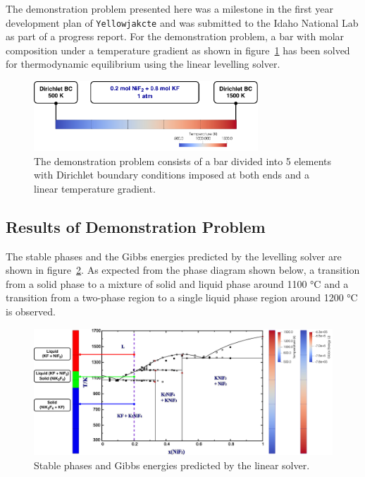  	The demonstration problem presented here was a milestone in the first year development plan of \texttt{Yellowjakcte} and was submitted to the Idaho National Lab as part of a progress report. For the demonstration problem, a bar with molar composition  under a temperature gradient as shown in figure~\ref{fig:demo_problem} has been solved for thermodynamic equilibrium using the linear levelling solver.
    
    	\begin{figure}[h]
        		\centering
        		\includegraphics[width=0.75\textwidth]{figures/Demo_prob.pdf}
        		\caption{The demonstration problem consists of a bar divided into 5 elements with Dirichlet boundary conditions imposed at both ends and a linear temperature gradient.}
        		\label{fig:demo_problem}
    	\end{figure}

	\subsection{Results of Demonstration Problem}
	The stable phases and the Gibbs energies predicted by the levelling solver are shown in figure~\ref{fig:results}. As expected from the phase diagram shown below, a transition from a solid phase to a mixture of solid and liquid phase around 1100 \si{\celsius} and a transition from a two-phase region to a single  liquid phase region around 1200 \si{\celsius} is observed.
    
    	\begin{figure}[h]
        		\centering
        		\includegraphics[width=\textwidth]{figures/Results.pdf}
        		\caption{Stable phases and Gibbs energies predicted by the linear solver.}
        		\label{fig:results}
    	\end{figure}

